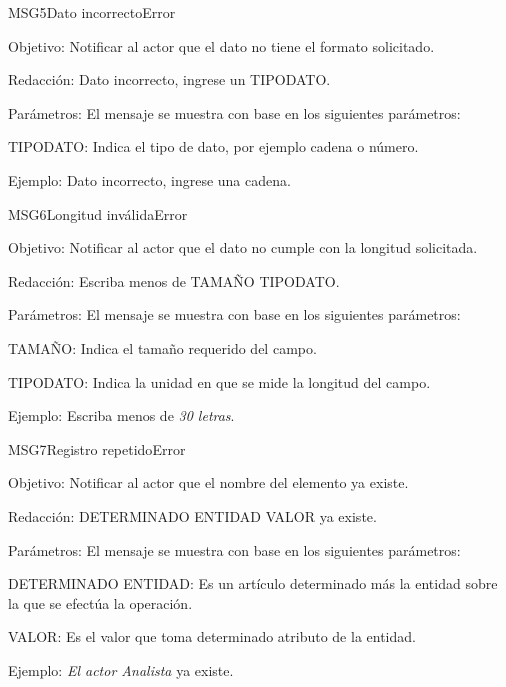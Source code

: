 \begin{mensaje}{MSG5}{Dato incorrecto}{Error}
    \item[Objetivo:] Notificar al actor que el dato no tiene el formato solicitado.
    \item[Redacción:] Dato incorrecto, ingrese un TIPODATO.
    \item[Parámetros:] El mensaje se muestra con base en los siguientes parámetros:
    \begin{Citemize}
	\item TIPODATO: Indica el tipo de dato, por ejemplo cadena o número.
    \end{Citemize}
    \item[Ejemplo:] Dato incorrecto, ingrese una cadena.
\end{mensaje}

\begin{mensaje}{MSG6}{Longitud inválida}{Error}
    \item[Objetivo:] Notificar al actor que el dato no cumple con la longitud solicitada.
    \item[Redacción:] Escriba menos de TAMAÑO TIPODATO.
    \item[Parámetros:] El mensaje se muestra con base en los siguientes parámetros:
    \begin{Citemize}
	\item TAMAÑO: Indica el tamaño requerido del campo.
	\item TIPODATO: Indica la unidad en que se mide la longitud del campo.
    \end{Citemize}
    \item[Ejemplo:] Escriba menos de {\em 30 letras}.
\end{mensaje}

\begin{mensaje}{MSG7}{Registro repetido}{Error}
    \item[Objetivo:] Notificar al actor que el nombre del elemento ya existe.
    \item[Redacción:] DETERMINADO ENTIDAD VALOR ya existe.
    \item[Parámetros:] El mensaje se muestra con base en los siguientes parámetros:
    \begin{Citemize}
	\item DETERMINADO ENTIDAD: Es un artículo determinado más la entidad sobre la que se efectúa la operación.
	\item VALOR: Es el valor que toma determinado atributo de la entidad.
    \end{Citemize}
    \item[Ejemplo:] {\em El actor Analista} ya existe.
\end{mensaje}

